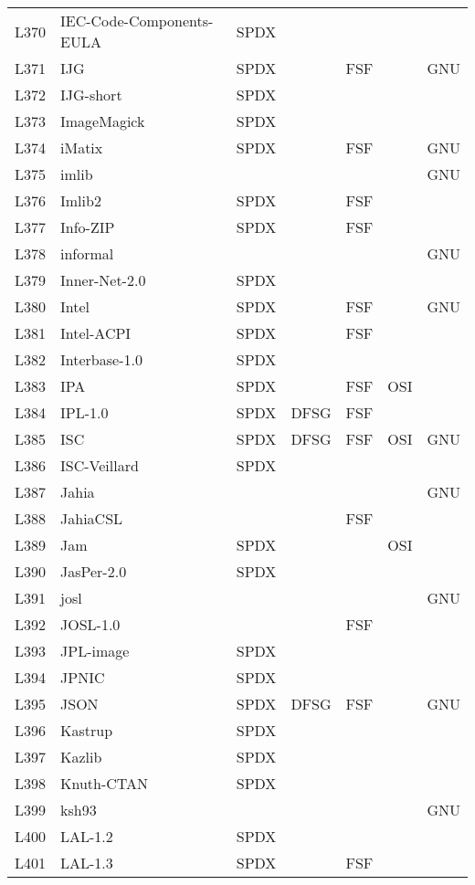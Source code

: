 \begin{longtable}[h]{m{2cm} | m{7cm} | c | c | c | c | c}
  L370 & IEC-Code-Components-EULA & SPDX &  &  &  &  \\
  L371 & IJG & SPDX &  & FSF &  & GNU \\
  L372 & IJG-short & SPDX &  &  &  &  \\
  L373 & ImageMagick & SPDX &  &  &  &  \\
  L374 & iMatix & SPDX &  & FSF &  & GNU \\
  L375 & imlib &  &  &  &  & GNU \\
  L376 & Imlib2 & SPDX &  & FSF &  &  \\
  L377 & Info-ZIP & SPDX &  & FSF &  &  \\
  L378 & informal &  &  &  &  & GNU \\
  L379 & Inner-Net-2.0 & SPDX &  &  &  &  \\
  L380 & Intel & SPDX &  & FSF &  & GNU \\
  L381 & Intel-ACPI & SPDX &  & FSF &  &  \\
  L382 & Interbase-1.0 & SPDX &  &  &  &  \\
  L383 & IPA & SPDX &  & FSF & OSI &  \\
  L384 & IPL-1.0 & SPDX & DFSG & FSF &  &  \\
  L385 & ISC & SPDX & DFSG & FSF & OSI & GNU \\
  L386 & ISC-Veillard & SPDX &  &  &  &  \\
  L387 & Jahia &  &  &  &  & GNU \\
  L388 & JahiaCSL &  &  & FSF &  &  \\
  L389 & Jam & SPDX &  &  & OSI &  \\
  L390 & JasPer-2.0 & SPDX &  &  &  &  \\
  L391 & josl &  &  &  &  & GNU \\
  L392 & JOSL-1.0 &  &  & FSF &  &  \\
  L393 & JPL-image & SPDX &  &  &  &  \\
  L394 & JPNIC & SPDX &  &  &  &  \\
  L395 & JSON & SPDX & DFSG & FSF &  & GNU \\
  L396 & Kastrup & SPDX &  &  &  &  \\
  L397 & Kazlib & SPDX &  &  &  &  \\
  L398 & Knuth-CTAN & SPDX &  &  &  &  \\
  L399 & ksh93 &  &  &  &  & GNU \\
  L400 & LAL-1.2 & SPDX &  &  &  &  \\
  L401 & LAL-1.3 & SPDX &  & FSF &  &  \\

\end{longtable}
